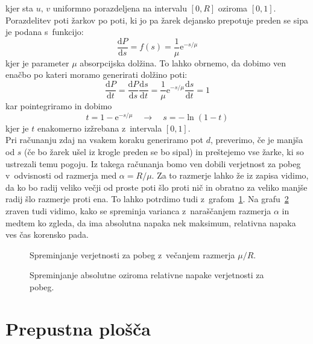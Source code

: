 \documentclass[a4paper,pdftex,10pt]{article}
\numberwithin{figure}{section} %
\begin{document}
kjer sta $u, \, v$ uniformno porazdeljena na intervalu $[0,R]$ oziroma $[0,1]$.
Porazdelitev poti žarkov po poti, ki jo pa žarek dejansko prepotuje preden se sipa je podana
s~funkcijo:
\begin{equation}
    \frac{\text{d}P}{\text{d}s} = f(s) = \frac{1}{\mu} \mathrm{e}^{-s/\mu}
\end{equation}
kjer je parameter $\mu$ absorpcijska dolžina. To lahko obrnemo, da dobimo ven enačbo
po kateri moramo generirati dolžino poti:
\begin{equation}
    \frac{\text{d}P}{\text{d}t} = \frac{\text{d}P}{\text{d}s} \frac{\text{d}s}{\text{d}t} =
    \frac{1}{\mu} \mathrm{e}^{-s/\mu} \frac{\text{d}s}{\text{d}t} = 1
\end{equation}
kar pointegriramo in dobimo
\begin{equation}
    t = 1 - \mathrm{e}^{-s/\mu} \quad \rightarrow \quad s = - \ln (1-t)
\end{equation}
kjer je $t$ enakomerno izžrebana z~intervala $[0,1]$.\\
Pri računanju zdaj na vsakem koraku generiramo pot $d$, preverimo, če je manjša od $s$ 
(če bo žarek ušel iz krogle preden se bo sipal) in preštejemo vse žarke, ki so
ustrezali temu pogoju. Iz takega računanja bomo ven dobili verjetnost za pobeg
v~odvisnosti od razmerja med $\alpha = R/\mu$. Za to razmerje lahko že iz zapisa vidimo,
da ko bo radij veliko večji od proste poti šlo proti nič in obratno za veliko manjše
radij šlo razmerje proti ena. To lahko potrdimo tudi z~grafom~\ref{slika5}. Na 
grafu~\ref{slika6} zraven tudi vidimo, kako se spreminja varianca z~naraščanjem
razmerja $\alpha$ in medtem ko zgleda, da ima absolutna napaka nek maksimum, relativna
napaka ves čas korensko pada.
\begin{figure}    
    \centering
    \resizebox{0.75\linewidth}{!}{}
    \caption{Spreminjanje verjetnosti za pobeg z~večanjem razmerja $\mu/R$.}
    \label{slika5}
\end{figure}
\begin{figure}    
    \centering
    \resizebox{0.75\linewidth}{!}{}
    \caption{Spreminjanje absolutne oziroma relativne napake verjetnosti za pobeg.}
    \label{slika6}
\end{figure}
\pagebreak

\section{Prepustna plošča}
\end{document}
